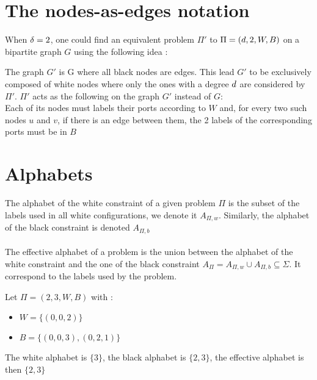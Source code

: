 \section{The nodes-as-edges notation}
When $\delta = 2$, one could find an equivalent problem $\Pi'$ to $\Pi = (d,2,W,B)$ on a bipartite graph $G$ using the following idea \cite{1}:

The graph $G'$ is G where all black nodes are edges. This lead $G'$ to be exclusively composed of white nodes where only the ones with a degree $d$ are considered by $\Pi'$.
$\Pi'$ acts as the following on the graph $G'$ instead of $G$:\\
Each of its nodes must labels their ports according to $W$ and, for every two such nodes $u$ and $v$, if there is an edge between them, the 2 labels of the corresponding ports must be in $B$\\

\section{Alphabets}
The alphabet of the white constraint of a given problem $\Pi$ is the subset of the labels used in all white configurations, we denote it $A_{\Pi,w}$. Similarly, the alphabet of the black constraint is denoted $A_{\Pi,b}$\\\\
The effective alphabet of a problem is the union between the alphabet of the white constraint and the one of the black constraint $A_{\Pi} = A_{\Pi,w} \cup A_{\Pi,b} \subseteq \Sigma$. It correspond to the labels used by the problem.
\begin{exmp}
Let $\Pi = (2,3,W,B)$ with :
\begin{itemize}
    \item $W = \{(0,0,2)\}$
    \item $B = \{(0,0,3),(0,2,1)\}$
\end{itemize}
The white alphabet is $\{3\}$, the black alphabet is $\{2,3\}$, the effective alphabet is then $\{2,3\}$
\end{exmp}
